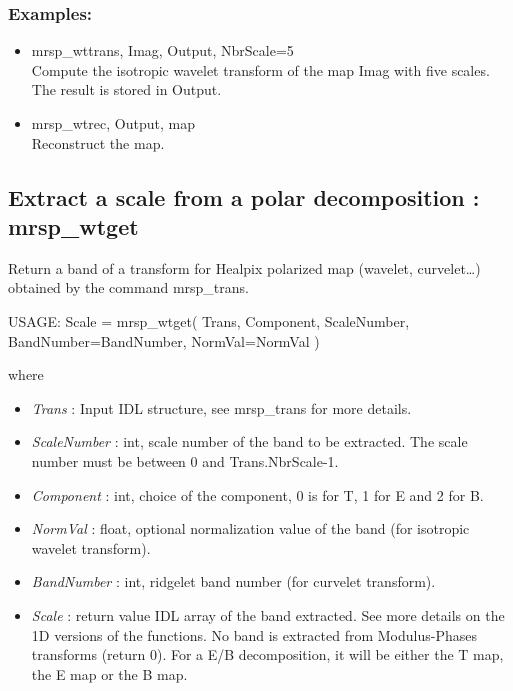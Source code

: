 \subsubsection*{Examples:} 
\begin{itemize}
\item mrsp\_wttrans, Imag, Output, NbrScale=5 \\
Compute the isotropic wavelet transform of the map Imag with five scales. The result is stored in Output.
\item mrsp\_wtrec, Output, map \\
Reconstruct the map. 
\end{itemize}





\subsection{Extract a scale from a polar decomposition : mrsp\_wtget}
Return a band of a transform for Healpix polarized map (wavelet, curvelet\ldots) obtained by the command mrsp\_trans.
{\bf
\begin{center}
     USAGE:  Scale = mrsp\_wtget( Trans, Component, ScaleNumber, BandNumber=BandNumber, NormVal=NormVal )
\end{center}}
where
\begin{itemize}
\item {\em Trans} : Input IDL structure, see mrsp\_trans for more details.
\item {\em ScaleNumber} : int, scale number of the band to be extracted. The scale number must be between 0 and Trans.NbrScale-1.
\item {\em Component} : int, choice of the component, 0 is for T, 1 for E and 2 for B.
\item {\em NormVal} : float, optional normalization value of the band (for isotropic wavelet transform).
\item {\em BandNumber} : int, ridgelet band number (for curvelet transform).
\item {\em Scale} : return value IDL array of the band extracted. See more details on the 1D versions of the functions. 
No band is extracted from Modulus-Phases transforms (return 0). For a E/B decomposition, it will be either the T map, the E map or the B map.
\end{itemize}




